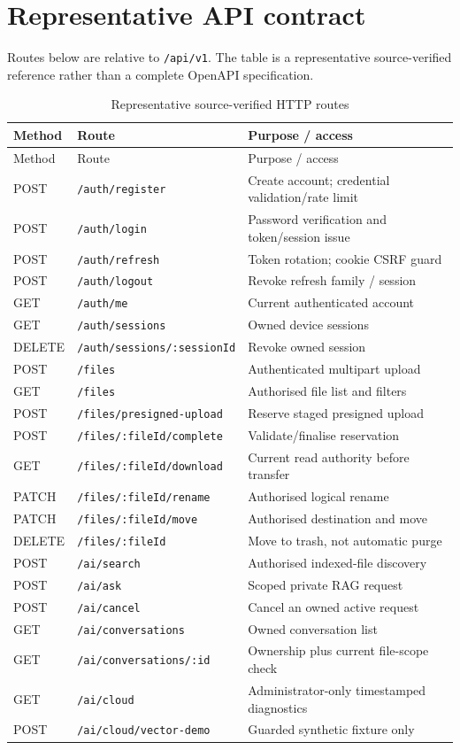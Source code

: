 \section{Representative API contract}
Routes below are relative to \texttt{/api/v1}. The table is a representative source-verified reference rather than a complete OpenAPI specification.
\begin{longtable}{p{.12\linewidth}p{.35\linewidth}p{.43\linewidth}}
\caption{Representative source-verified HTTP routes}\\\toprule Method&Route&Purpose / access\\\midrule\endfirsthead\toprule Method&Route&Purpose / access\\\midrule\endhead
POST&\texttt{/auth/register}&Create account; credential validation/rate limit\\
POST&\texttt{/auth/login}&Password verification and token/session issue\\
POST&\texttt{/auth/refresh}&Token rotation; cookie CSRF guard\\
POST&\texttt{/auth/logout}&Revoke refresh family / session\\
GET&\texttt{/auth/me}&Current authenticated account\\
GET&\texttt{/auth/sessions}&Owned device sessions\\
DELETE&\texttt{/auth/sessions/:sessionId}&Revoke owned session\\
POST&\texttt{/files}&Authenticated multipart upload\\
GET&\texttt{/files}&Authorised file list and filters\\
POST&\texttt{/files/presigned-upload}&Reserve staged presigned upload\\
POST&\texttt{/files/:fileId/complete}&Validate/finalise reservation\\
GET&\texttt{/files/:fileId/download}&Current read authority before transfer\\
PATCH&\texttt{/files/:fileId/rename}&Authorised logical rename\\
PATCH&\texttt{/files/:fileId/move}&Authorised destination and move\\
DELETE&\texttt{/files/:fileId}&Move to trash, not automatic purge\\
POST&\texttt{/ai/search}&Authorised indexed-file discovery\\
POST&\texttt{/ai/ask}&Scoped private RAG request\\
POST&\texttt{/ai/cancel}&Cancel an owned active request\\
GET&\texttt{/ai/conversations}&Owned conversation list\\
GET&\texttt{/ai/conversations/:id}&Ownership plus current file-scope check\\
GET&\texttt{/ai/cloud}&Administrator-only timestamped diagnostics\\
POST&\texttt{/ai/cloud/vector-demo}&Guarded synthetic fixture only\\\bottomrule
\end{longtable}
